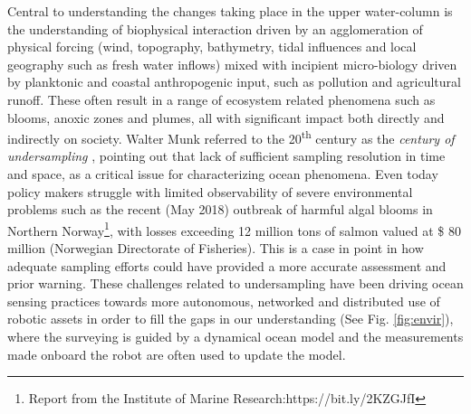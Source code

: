 \documentclass[aoas]{imsart}
\begin{document}
Central to understanding the changes taking place in the upper
water-column is the understanding of biophysical interaction driven by
an agglomeration of physical forcing (wind, topography, bathymetry,
tidal influences and local geography such as fresh water inflows)
mixed with incipient micro-biology driven by planktonic and coastal
anthropogenic input, such as pollution and agricultural runoff. These
often result in a range of ecosystem related phenomena such as blooms,
anoxic zones and plumes, all with significant impact both directly and
indirectly on society. Walter Munk referred to the
20\textsuperscript{th} century as the \emph{century of undersampling}
\citep{munk2002}, pointing out that lack of sufficient sampling
resolution in time and space, as a critical issue for characterizing
ocean phenomena. Even today policy makers struggle with limited
observability of severe environmental problems such as the recent (May
2018) outbreak of harmful algal blooms in Northern
Norway\footnote{Report from the Institute of Marine
  Research:https://bit.ly/2KZGJfI}, with losses exceeding 12 million
tons of salmon valued at \$ 80 million (Norwegian Directorate of
Fisheries). This is a case in point in how adequate sampling efforts
could have provided a more accurate assessment and prior
warning. These challenges related to undersampling have been driving
ocean sensing practices towards more autonomous, networked and
distributed use of robotic assets in order to fill the gaps in our
understanding (See Fig. \ref{fig:envir}), where the surveying is
guided by a dynamical ocean model and the measurements made onboard
the robot are often used to update the model.
\end{document}
